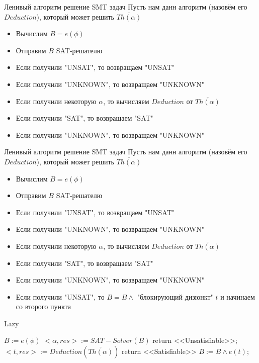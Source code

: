 \documentclass{beamer}
\begin{document}
\begin{frame}{Ленивый алгоритм решение SMT задач}
Пусть нам данн алгоритм (назовём его $Deduction$), который может решить $\overline{Th(\alpha)}$
\begin{itemize}
\item Вычислим $B = e(\phi)$
\item Отправим $B$ SAT-решателю
\item Если получили "UNSAT", то возвращаем "UNSAT"
\item Если получили "UNKNOWN", то возвращаем "UNKNOWN"
\item Если получили некоторую $\alpha$, то вычисляем $Deduction$ от $\overline{Th(\alpha)}$
\item Если получили "SAT", то возвращаем "SAT"
\item Если получили "UNKNOWN", то возвращаем "UNKNOWN"
\end{itemize}
\end{frame}

\begin{frame}{Ленивый алгоритм решение SMT задач}
Пусть нам данн алгоритм (назовём его $Deduction$), который может решить $\overline{Th(\alpha)}$
\begin{itemize}
\item Вычислим $B = e(\phi)$
\item Отправим $B$ SAT-решателю
\item Если получили "UNSAT", то возвращаем "UNSAT"
\item Если получили "UNKNOWN", то возвращаем "UNKNOWN"
\item Если получили некоторую $\alpha$, то вычисляем $Deduction$ от $\overline{Th(\alpha)}$
\item Если получили "SAT", то возвращаем "SAT"
\item Если получили "UNKNOWN", то возвращаем "UNKNOWN"
\item Если получили "UNSAT", то $B = B \wedge$ "блокирующий дизюнкт" $t$ и начинаем со второго пункта
\end{itemize}
\end{frame}

\begin{frame}{Lazy}
\begin{algorithmic}
    \State $B := e(\phi)$
        \State $<\alpha, res> := SAT-Solver(B)$
            \State return <<Unsatisfiable>>;
        \Else
            \State $<t, res> := Deduction(\overline{Th(\alpha)})$
                \State return <<Satisfiable>>
            \EndIf
            \State $B := B \wedge e(t)$;
        \EndIf
    \EndWhile
\EndFunction
\end{algorithmic}
\end{frame}
\end{document}
